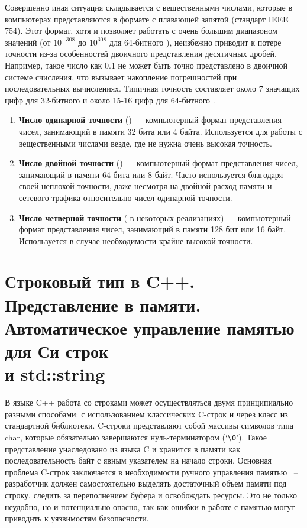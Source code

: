 Совершенно иная ситуация складывается с вещественными числами, которые в компьютерах представляются в формате с плавающей запятой (стандарт IEEE 754). Этот формат, хотя и 
позволяет работать с очень большим диапазоном значений (от $10^{-308}$ до $10^{308}$ для 64-битного ), неизбежно приводит к потере точности из-за особенностей 
двоичного представления десятичных дробей. Например, такое число как 0.1 не может быть точно представлено в двоичной системе счисления, что вызывает накопление 
погрешностей при последовательных вычислениях. Типичная точность составляет около 7 значащих цифр для 32-битного
 и около 15-16 цифр для 64-битного .
\begin{enumerate}
    \item \textbf{Число одинарной точности} () --- компьютерный формат представления чисел, занимающий в памяти 32 бита или 
          4 байта. Используется для работы с вещественными числами везде, где не нужна очень высокая точность.
    \item \textbf{Число двойной точности} () --- компьютерный формат представления чисел, занимающий в памяти 64 бита или 8 байт.
          Часто используется благодаря своей неплохой точности, даже несмотря на двойной расход памяти и сетевого трафика относительно чисел одинарной точности.
    \item \textbf{Число четверной точности} ( в некоторых реализациях) --- компьютерный формат представления чисел, занимающий в памяти 
          128 бит или 16 байт. Используется в случае необходимости крайне высокой точности.
\end{enumerate}


\section{Строковый тип в C++. Представление в памяти.\\ Автоматическое управление памятью для Си строк\\ и std::string}
В языке C++ работа со строками может осуществляться двумя принципиально разными способами: с использованием классических C-строк и через класс  из 
стандартной библиотеки. C-строки представляют собой массивы символов типа char, которые обязательно завершаются нуль-терминатором (`\verb|\0|'). Такое представление унаследовано из 
языка C и хранится в памяти как последовательность байт с явным указателем на начало строки. Основная проблема C-строк заключается в необходимости ручного управления памятью
~-- разработчик должен самостоятельно выделять достаточный объем памяти под строку, следить за переполнением буфера и освобождать ресурсы. Это не только неудобно, но и 
потенциально опасно, так как ошибки в работе с памятью могут приводить к уязвимостям безопасности.

